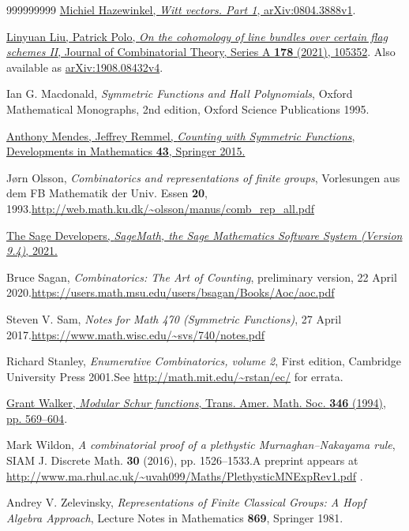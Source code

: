 \documentclass[numbers=enddot,12pt,final,onecolumn,notitlepage]{scrartcl}%
\theoremstyle{definition}
\begin{document}
\begin{thebibliography}{999999999}
\href{https://arxiv.org/abs/0804.3888v1}{Michiel
Hazewinkel, \textit{Witt vectors. Part 1}, arXiv:0804.3888v1}.

%
\href{https://doi.org/10.1016/j.jcta.2020.105352}{Linyuan Liu, Patrick Polo,
\textit{On the cohomology of line bundles over certain flag schemes II},
Journal of Combinatorial Theory, Series A \textbf{178} (2021), 105352}. Also
available as \href{https://arxiv.org/abs/1908.08432v4}{arXiv:1908.08432v4}.

Ian G. Macdonald, \textit{Symmetric Functions and
Hall Polynomials}, Oxford Mathematical Monographs, 2nd edition, Oxford Science
Publications 1995.

%
\href{https://doi.org/10.1007/978-3-319-23618-6}{Anthony Mendes, Jeffrey
Remmel, \textit{Counting with Symmetric Functions}, Developments in
Mathematics \textbf{43}, Springer 2015.}

J\o rn Olsson, \textit{Combinatorics and
representations of finite groups}, Vorlesungen aus dem FB Mathematik der Univ.
Essen \textbf{20}, 1993.\newline\url{http://web.math.ku.dk/~olsson/manus/comb_rep_all.pdf}

\href{http://www.sagemath.org}{The Sage
Developers, \textit{SageMath, the Sage Mathematics Software System (Version
9.4)}, 2021.}

Bruce Sagan, \textit{Combinatorics: The Art of
Counting}, preliminary version, 22 April 2020.\newline\url{https://users.math.msu.edu/users/bsagan/Books/Aoc/aoc.pdf}

Steven V. Sam, \textit{Notes for Math 470 (Symmetric
Functions)}, 27 April 2017.\newline\url{https://www.math.wisc.edu/~svs/740/notes.pdf}

Richard Stanley, \textit{Enumerative
Combinatorics, volume 2}, First edition, Cambridge University Press
2001.\newline See \url{http://math.mit.edu/~rstan/ec/} for errata.

%
\href{https://doi.org/10.1090/S0002-9947-1994-1273543-0}{Grant Walker,
\textit{Modular Schur functions}, Trans. Amer. Math. Soc. \textbf{346} (1994),
pp. 569--604}.

Mark Wildon, \textit{A combinatorial proof of a
plethystic Murnaghan--Nakayama rule}, SIAM J. Discrete Math. \textbf{30}
(2016), pp. 1526--1533.\newline A preprint appears at
\url{http://www.ma.rhul.ac.uk/~uvah099/Maths/PlethysticMNExpRev1.pdf} .

Andrey V. Zelevinsky, \textit{Representations of
Finite Classical Groups: A Hopf Algebra Approach}, Lecture Notes in
Mathematics \textbf{869}, Springer 1981.
\end{thebibliography}
\end{document}
